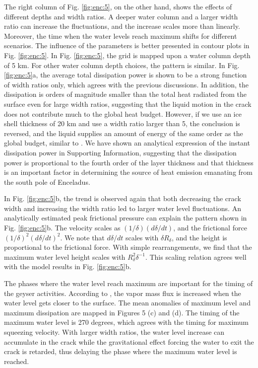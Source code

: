 \documentclass[draft]{agujournal2019}
\begin{document}
\begin{refsection}
The right column of Fig. \ref{fig:enc:5}, on the other hand, shows the effects of different depths and width ratios. A deeper water column and a larger width ratio can increase the fluctuations, and the increase scales more than linearly. Moreover, the time when the water levels reach maximum shifts for different scenarios. The influence of the parameters is better presented in contour plots in Fig. \ref{fig:enc:5}. In Fig. \ref{fig:enc:5}, the grid is mapped upon a water column depth of 5 km. For other water column depth choices, the pattern is similar. In Fig. \ref{fig:enc:5}a, the average total dissipation power is shown to be a strong function of width ratios only, which agrees with the previous discussions. In addition, the dissipation is orders of magnitude smaller than the total heat radiated from the surface even for large width ratios, suggesting that the liquid motion in the crack does not contribute much to the global heat budget. However, if we use an ice shell thickness of 20 km and use a width ratio larger than 5, the conclusion is reversed, and the liquid supplies an amount of energy of the same order as the global budget, similar to . We have shown an analytical expression of the instant dissipation power in Supporting Information, suggesting that the dissipation power is proportional to the fourth order of the layer thickness and that thickness is an important factor in determining the source of heat emission emanating from the south pole of Enceladus. 

In Fig. \ref{fig:enc:5}b, the trend is observed again that both decreasing the crack width and increasing the width ratio led to larger water level fluctuations. An analytically estimated peak frictional
pressure can explain the pattern shown in Fig. \ref{fig:enc:5}b. The velocity scales as $(1/\delta)(d\delta/dt)$, and the
frictional force $(1/\delta)^2(d\delta/dt)^2$. We note that $d\delta/dt$ scales with $\delta R_{\delta}$, and the height is proportional to the frictional force. With simple rearrangements, we find that the maximum water level height scales
with $R_\delta^2 \delta^{-1}$. This scaling relation agrees well with the model results in Fig. \ref{fig:enc:5}b.

The phases where the water level reach maximum are important for the timing of the geyser activities. According to , the vapor mass flux is increased when the water level gets closer to the surface. The mean anomalies of maximum level and maximum dissipation are mapped in Figures 5 (c) and (d). The timing of the maximum water level is 270 degrees, which agrees with the timing for maximum squeezing velocity. With larger width ratios, the water level increase can accumulate in the crack while the gravitational effect forcing the water to exit the crack is retarded, thus delaying the phase where the maximum water level is reached.


\end{refsection}
\end{document}
